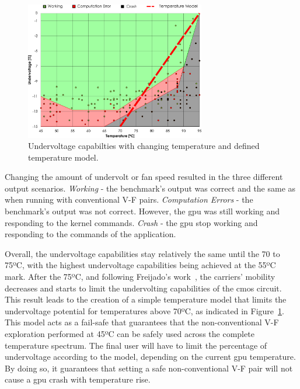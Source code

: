 \begin{figure}[htb]
    \centering
        \includegraphics[width=0.7\textwidth]{Figures/GPU_characterization/UndervoltageWithTemperature_new.pdf}
        \caption{Undervoltage capabilties with changing temperature and defined temperature model.}
    \label{fig:temp_model}
\end{figure}

Changing the amount of undervolt or fan speed resulted in the three different output scenarios. 
\textit{Working} - the benchmark's output was correct and the same as when running with conventional V-F pairs.
\textit{Computation Errors} - the benchmark's output was not correct. However, the \acrshort{gpu} was still working and responding to the kernel commands. \textit{Crash} - the \acrshort{gpu} stop working and responding to the commands of the application.

Overall, the undervoltage capabilities stay relatively the same until the 70 to 75ºC, with the highest undervoltage capabilities being achieved at the 55ºC mark. After the 75ºC, and following Freijado's work~\cite{freijedo_modeling_2012}, the carriers' mobility decreases and starts to limit the undervolting capabilities of the \acrshort{cmos} circuit. This result leads to the creation of a simple temperature model that limits the undervoltage potential for temperatures above 70ºC, as indicated in Figure~\ref{fig:temp_model}. This model acts as a fail-safe that guarantees that the non-conventional V-F exploration performed at 45ºC can be safely used across the complete temperature spectrum. The final user will have to limit the percentage of undervoltage according to the model, depending on the current \acrshort{gpu} temperature. By doing so, it guarantees that setting a safe non-conventional V-F pair will not cause a \acrshort{gpu} crash with temperature rise.




